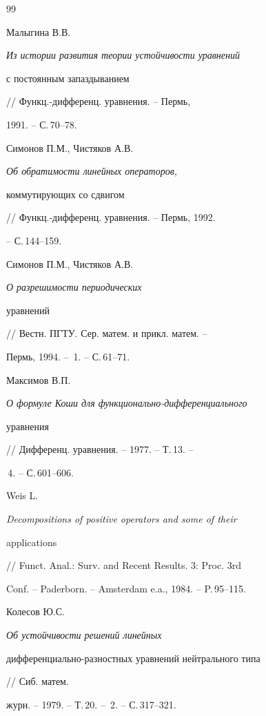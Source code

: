 \begin{thebibliography}{99}


Малыгина В.В. {\em Из истории развития теории устойчивости уравнений


с постоянным запаздыванием} // Функц.-дифференц. уравнения. -- Пермь,


1991. -- С.\,70--78.







Симонов П.М., Чистяков А.В. {\em Об обратимости линейных операторов,


коммутирующих со сдвигом} // Функц.-дифференц. уравнения. -- Пермь, 1992.


-- С.\,144--159.







Симонов П.М., Чистяков А.В. {\em О разрешимости периодических


уравнений} // Вестн. ПГТУ. Сер. матем. и прикл. матем. --


Пермь, 1994. -- \No\,1. -- С.\,61--71.







Максимов В.П. {\em О формуле Коши для функционально-дифференциального


уравнения} // Дифференц. уравнения. -- 1977. -- Т.\,13. --


\No\,4. -- С.\,601--606.







Weis L. {\em Decompositions of positive operators and some of their


applications} // Funct. Anal.: Surv. and Recent Results. 3: Proc. 3rd


Conf. -- Paderborn. -- Amsterdam e.a., 1984. -- P.\,95--115.







Колесов Ю.С. {\em Об устойчивости решений линейных


дифференциально-разностных уравнений нейтрального типа} // Сиб. матем.


журн. -- 1979. -- Т.\,20. -- \No\,2. -- С.\,317--321.






\end{thebibliography}
